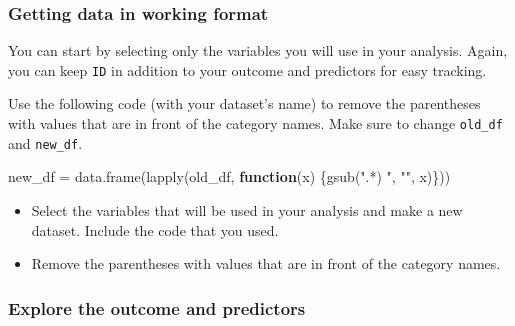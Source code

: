 \documentclass[
  letterpaper,
  DIV=11,
  numbers=noendperiod]{scrartcl}
\newenvironment{Shaded}{\begin{snugshade}}{\end{snugshade}}
\newcommand{\ControlFlowTok}[1]{\textcolor[rgb]{0.00,0.23,0.31}{\textbf{#1}}}
\newcommand{\FunctionTok}[1]{\textcolor[rgb]{0.28,0.35,0.67}{#1}}
\newcommand{\NormalTok}[1]{\textcolor[rgb]{0.00,0.23,0.31}{#1}}
\newcommand{\OtherTok}[1]{\textcolor[rgb]{0.00,0.23,0.31}{#1}}
\newcommand{\StringTok}[1]{\textcolor[rgb]{0.13,0.47,0.30}{#1}}
\providecommand{\tightlist}{%
  \setlength{\itemsep}{0pt}\setlength{\parskip}{0pt}}
\begin{document}
\subsubsection{Getting data in working
format}\label{getting-data-in-working-format}

You can start by selecting only the variables you will use in your
analysis. Again, you can keep \texttt{ID} in addition to your outcome
and predictors for easy tracking.

Use the following code (with your dataset's name) to remove the
parentheses with values that are in front of the category names. Make
sure to change \texttt{old\_df} and \texttt{new\_df}.

\begin{Shaded}
\begin{Highlighting}[]
\NormalTok{new\_df }\OtherTok{=} \FunctionTok{data.frame}\NormalTok{(}\FunctionTok{lapply}\NormalTok{(old\_df, }\ControlFlowTok{function}\NormalTok{(x) \{}\FunctionTok{gsub}\NormalTok{(}\StringTok{".*) "}\NormalTok{, }\StringTok{""}\NormalTok{, x)\}))}
\end{Highlighting}
\end{Shaded}

\begin{tcolorbox}[enhanced jigsaw, toptitle=1mm, toprule=.15mm, leftrule=.75mm, bottomtitle=1mm, breakable, opacityback=0, titlerule=0mm, title=\textcolor{quarto-callout-important-color}{\faExclamation}\hspace{0.5em}{Task}, arc=.35mm, colback=white, rightrule=.15mm, left=2mm, colbacktitle=quarto-callout-important-color!10!white, coltitle=black, opacitybacktitle=0.6, colframe=quarto-callout-important-color-frame, bottomrule=.15mm]

\begin{itemize}
\tightlist
\item
  Select the variables that will be used in your analysis and make a new
  dataset. Include the code that you used.
\item
  Remove the parentheses with values that are in front of the category
  names.
\end{itemize}

\end{tcolorbox}

\subsubsection{Explore the outcome and
predictors}\label{explore-the-outcome-and-predictors}
\end{document}
